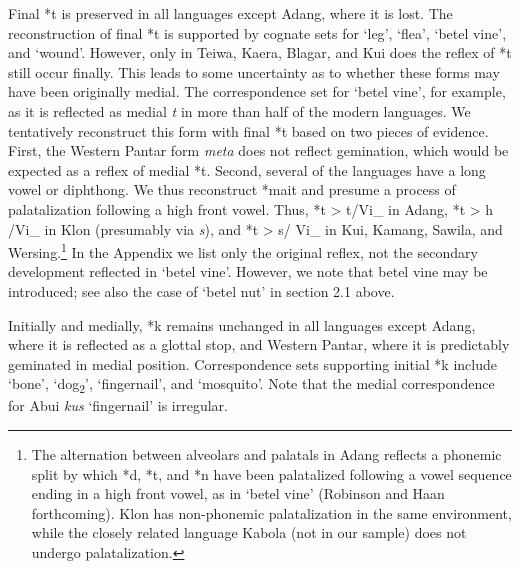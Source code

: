 Final *t is preserved in all languages except Adang, where it is lost. The reconstruction of final *t is supported by cognate sets for {\textquoteleft}leg{\textquoteright}, {\textquoteleft}flea{\textquoteright}, {\textquoteleft}betel vine{\textquoteright}, and {\textquoteleft}wound{\textquoteright}. However, only in Teiwa, Kaera, Blagar, and Kui does the reflex of *t still occur finally. This leads to some uncertainty as to whether these forms may have been originally medial. The correspondence set for {\textquoteleft}betel vine{\textquoteright}, for example, as it is reflected as medial \textit{t} in more than half of the modern languages. We tentatively reconstruct this form with final *t based on two pieces of evidence. First, the Western Pantar form \textit{meta} does not reflect gemination, which would be expected as a reflex of medial *t. Second, several of the languages have a long vowel or diphthong. We thus reconstruct *mait and presume a process of palatalization following a high front vowel. Thus, 
*t {\textgreater} t{\textesh}/Vi\_ in Adang, *t {\textgreater} h /Vi\_ in Klon (presumably via \textit{s}), and *t {\textgreater} s/ Vi\_ in Kui, Kamang, Sawila, and Wersing.\footnote{ The alternation between alveolars and palatals in Adang reflects a phonemic split by which *d, *t, and *n have been palatalized following a vowel sequence ending in a high front vowel, as in {\textquoteleft}betel vine{\textquoteright} (Robinson and Haan forthcoming). Klon has non-phonemic palatalization in the same environment, while the closely related language Kabola (not in our sample) does not undergo palatalization.} In the Appendix we list only the original reflex, not the secondary development reflected in {\textquoteleft}betel vine{\textquoteright}. However, we note that betel vine may be introduced; see also the case of {\textquoteleft}betel nut{\textquoteright} in section 2.1 above. 

Initially and medially, *k remains unchanged in all languages except Adang, where it is reflected as a glottal stop, and Western Pantar, where it is predictably geminated in medial position. Correspondence sets supporting initial *k include {\textquoteleft}bone{\textquoteright}, {\textquoteleft}dog\textsubscript{2}{\textquoteright}, {\textquoteleft}fingernail{\textquoteright}, and {\textquoteleft}mosquito{\textquoteright}. Note that the medial correspondence for Abui \textit{kus{\textsci}{\ng}} {\textquoteleft}fingernail{\textquoteright} is irregular. 

